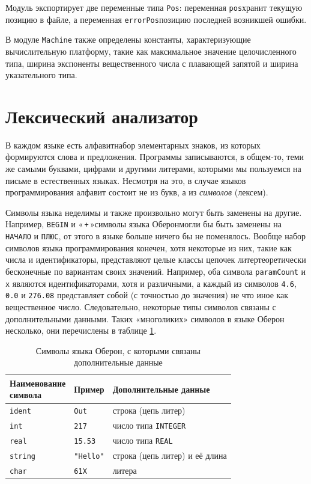 \documentclass[utf8]{lgu}
\newcommand{\tire}{\unskip\nobreak\thinspace\textemdash\thinspace}
\newcommand{\code}[1]{{\normalsize\texttt{#1}}}
\begin{document}
Модуль экспортирует две переменные типа \code{Pos}: переменная \code{pos}\tire хранит текущую позицию в файле, а переменная \code{errorPos}\tire позицию последней возникшей ошибки. 

В модуле \code{Machine} также определены константы, характеризующие вычислительную платформу, такие как максимальное значение целочисленного типа, ширина экспоненты вещественного числа с плавающей запятой и ширина указательного типа.

\section{Лексический анализатор}

\firstparskip В каждом языке есть алфавит\tire набор элементарных знаков, из которых формируются слова и предложения. Программы записываются, в общем-то, теми же самыми буквами, цифрами и другими литерами, которыми мы пользуемся на письме в естественных языках. Несмотря на это, в случае языков программирования алфавит состоит не из букв, а из \textit{символов} (лексем).

Символы языка неделимы и также произвольно могут быть заменены на другие. Например, \code{BEGIN} и «\,\code{+}\,»\tire символы языка Оберон\tire могли бы быть заменены на \code{НАЧАЛО} и \code{ПЛЮС}, от этого в языке больше ничего бы не поменялось. Вообще набор символов языка программирования конечен, хотя некоторые из них, такие как числа и идентификаторы, представляют целые классы цепочек литер\tire теоретически бесконечные по вариантам своих значений. Например, оба символа \code{paramCount} и \code{x} являются идентификаторами, хотя и различными, а каждый из символов \code{4.6}, \code{0.0} и \code{276.08} представляет собой (с точностью до значения) не что иное как вещественное число. Следовательно, некоторые типы символов связаны с дополнительными данными. Таких «многоликих» символов в языке Оберон несколько, они перечислены в таблице \ref{tab:OberonSymbols}.

\vspace{5mm}
\begin{table}[H]
\centering
\caption{Символы языка Оберон, с которыми связаны дополнительные данные}
\label{tab:OberonSymbols}
\vspace{8pt}
\small
\begin{tabular}{@{} l l l @{}}
\toprule
  \parbox{2.7cm}{\vspace{1mm}\centering\noindent Наименование \\ символа\vspace{1mm}} & Пример & Дополнительные данные \\
\midrule
  \code{ident}  & \code{Out}     & строка (цепь литер) \\
  \code{int}    & \code{217}     & число типа \code{INTEGER} \\
  \code{real}   & \code{15.53}   & число типа \code{REAL} \\
  \code{string} & \code{"Hello"} & строка (цепь литер) и её длина \\
  \code{char}   & \code{61X}     & литера \\
\bottomrule
\end{tabular}
\end{table}
\end{document}
